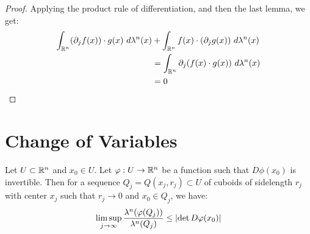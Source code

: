 \begin{proof}
	Applying the product rule of differentiation, and then the last lemma, we get:
	\begin{align*}
		\int_{\mathbb{R}^n} (\partial_j f(x)) \cdot g(x) ~d\lambda^n(x) &+ \int_{\mathbb{R}^n} f(x) \cdot (\partial_j g(x)) ~d\lambda^n(x)\\
		&= \int_{\mathbb{R}^n} \partial_j (f(x) \cdot g(x)) ~d\lambda^n(x)\\
		&= 0	
	\end{align*}
\end{proof}
\clearpage

\section{Change of Variables}
\begin{lemma}
	Let $U \subset \mathbb{R}^n$ and $x_0 \in U$. Let $\varphi : U \to \mathbb{R}^n$ be a function such that $D\phi(x_0)$ is invertible.
	\newpar
	Then for a sequence $Q_j = Q(x_j, r_j) \subset U$ of cuboids of sidelength $r_j$ with center $x_j$ such that $r_j \to 0$ and $x_0 \in Q_j$, we have:
	\begin{align*}
		\limsup_{j \to \infty} \frac{\lambda^n(\varphi(Q_j))}{\lambda^n(Q_j)}
		\leq
		\abs{\det D\varphi(x_0)}
	\end{align*}
\end{lemma}
